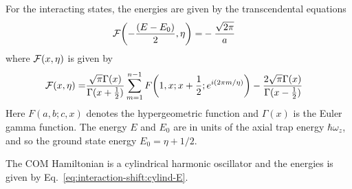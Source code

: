 For the interacting states,
the energies are given by the transcendental equations~\cite{idziaszek_analytical_2006}
\begin{align*}
  \mathcal{F}{\left({-\frac{{\left({E-E_0}\right)}}{2} , \eta}\right)}=&-\frac{\sqrt{2\pi}}{a}
\end{align*}
where $\mathcal{F}{\left({x, \eta}\right)}$ is given by
\begin{align*}
  \mathcal{F}{\left({x, \eta}\right)}=
  &\frac{\sqrt{\pi} \Gamma(x)}{\Gamma(x+\frac{1}{2})}
    \sum_{m=1}^{n-1} F{\left({1,x;x+\frac{1}{2} ; e^{i(2\pi m/ \eta )}}\right)}
    -\frac{2 \sqrt{\pi} \Gamma(x)}{\Gamma(x-\frac{1}{2})}
\end{align*}
Here $F(a,b;c,x)$ denotes the hypergeometric function
and $\Gamma(x)$ is the Euler gamma function.
The energy $E$ and $E_0$ are in units of the axial trap energy $\hbar \omega_z$,
and so the ground state energy $E_0  = \eta + 1/2$.

The COM Hamiltonian is a cylindrical harmonic oscillator and the energies is given by
Eq.~\ref{eq:interaction-shift:cylind-E}.


